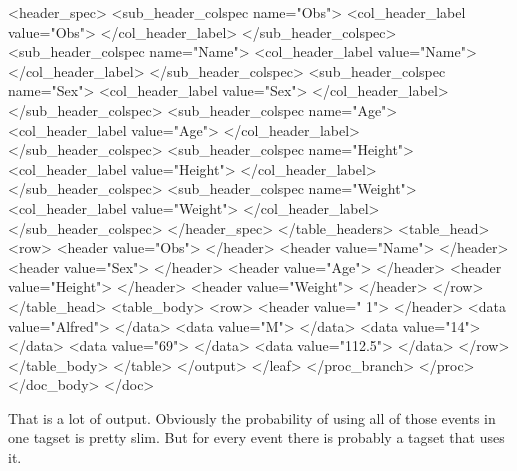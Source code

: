 \begin{sfvoutput}
                <header_spec>
                  <sub_header_colspec name="Obs">
                    <col_header_label value="Obs">
                    </col_header_label>
                  </sub_header_colspec>
                  <sub_header_colspec name="Name">
                    <col_header_label value="Name">
                    </col_header_label>
                  </sub_header_colspec>
                  <sub_header_colspec name="Sex">
                    <col_header_label value="Sex">
                    </col_header_label>
                  </sub_header_colspec>
                  <sub_header_colspec name="Age">
                    <col_header_label value="Age">
                    </col_header_label>
                  </sub_header_colspec>
                  <sub_header_colspec name="Height">
                    <col_header_label value="Height">
                    </col_header_label>
                  </sub_header_colspec>
                  <sub_header_colspec name="Weight">
                    <col_header_label value="Weight">
                    </col_header_label>
                  </sub_header_colspec>
                </header_spec>
              </table_headers>
              <table_head>
                <row>
                  <header value="Obs">
                  </header>
                  <header value="Name">
                  </header>
                  <header value="Sex">
                  </header>
                  <header value="Age">
                  </header>
                  <header value="Height">
                  </header>
                  <header value="Weight">
                  </header>
                </row>
              </table_head>
              <table_body>
                <row>
                  <header value=" 1">
                  </header>
                  <data value="Alfred">
                  </data>
                  <data value="M">
                  </data>
                  <data value="14">
                  </data>
                  <data value="69">
                  </data>
                  <data value="112.5">
                  </data>
                </row>
              </table_body>
            </table>
          </output>
        </leaf>
      </proc_branch>
    </proc>
  </doc_body>
</doc>
\end{sfvoutput}

That is a lot of output.  Obviously the probability of
using all of those events in one tagset is pretty slim.
But for every event there is probably a tagset that uses
it.  

